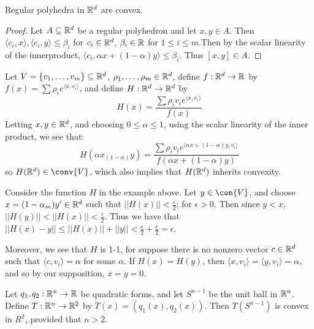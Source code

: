 \begin{lemma}\label{1.1.2}
    Regular polyhedra in $\mathbb{R}^d$ are convex.
\end{lemma}
\begin{proof}
    Let $A \subseteq \mathbb{R}^d$ be a regular polyhedron and let  $x,y \in A$. Then 
    $\langle{c_i,x}\rangle, \langle{c_i,y}\rangle \leq \beta_i$ for $c_i \in \mathbb{R}^d$, $\beta_i \in \mathbb{R}$ 
    for  $1 \leq i \leq m$.Then by the scalar linearity of the innerproduct,  $\langle{c_i, \alpha x+ (1-\alpha)y} \rangle
    \leq \beta_i$. Thus $[x,y] \in A$.
\end{proof}

\begin{example}
    Let $V=\{v_1, \dots, v_m\} \subseteq \mathbb{R}^d$, $\rho_1, \dots, \rho_m \in \mathbb{R}^d$, define $f:\mathbb{R}^d \rightarrow \mathbb{R}$ by 
    $f(x)=\sum{\rho_ie^{\langle{x,v_i}\rangle}}$, and define  $H: \mathbb{R}^d \rightarrow \mathbb{R}^d$ by 
        \begin{equation*}
            H(x)=\frac{\sum{\rho_iv_ie^{\langle{x,v_i}\rangle}}}{f(x)}
        \end{equation*} 
    Letting $x,y \in \mathbb{R}^d$, and choosing  $0 \leq \alpha \leq 1$, using the scalar linearity of 
    the inner product, we see that:
        \begin{equation*}
            H(\alpha x_(1-\alpha)y)=
            \frac{\sum{\rho_iv_ie^{\langle{\alpha x+(1-\alpha)y,v_i}\rangle}}}
            {f(\alpha x+(1-\alpha)y)}
        \end{equation*}
        so $H(\R^d) \in \conv{V}$, which also implies that $H(\mathbb{R}^d)$ inherits 
        convexity.
\end{example} 

\begin{example}
    Consider the function $H$ in the example above. Let $y \in \con{V}$, and choose 
    $x=(1-\alpha_m)y' \in \mathbb{R}^d$ such that $||H(x)||<\frac{\epsilon}{2}$; for $\epsilon>0$. Then since 
    $y<x$,  $||H(y)||<||H(x)||<\frac{\epsilon}{2}$. Thus we have that $||H(x)-y|| \leq 
    ||H(x)||+||y||<\frac{\epsilon}{2}+\frac{\epsilon}{2}=\epsilon$.

    Moreover, we see that $H$ is 1-1, for suppose there is no nonzero vector  $c \in \mathbb{R}^d$ 
    such that  $\langle{c,v_i}\rangle=\alpha$ for some $\alpha$. If  $H(x)=H(y)$, then 
    $\langle{x,v_i}\rangle=\langle{y,v_i}\rangle=\alpha$, and so by our supposition, $x=y=0$.
\end{example}

\begin{example}
    Let $q_1,q_2: \mathbb{R}^n \rightarrow \mathbb{R}$ be quadratic forms, and let $S^{n-1}$ be the unit 
    ball in $\mathbb{R}^n$. Define $T:\mathbb{R}^n \rightarrow \mathbb{R}^2$ by  $T(x)=(q_1(x),q_2(x))$. Then 
    $T(S^{n-1})$ is convex in  $R^2$, provided that  $n>2$.
\end{example} 

